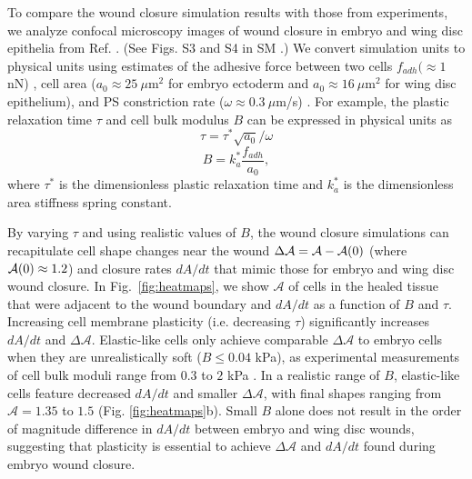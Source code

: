 \documentclass[%
 reprint,
superscriptaddress,
amsmath,amssymb,
prl,
floatfix,
]{revtex4-2}
\begin{document}
To compare the wound closure simulation results with those from experiments, we analyze confocal microscopy images of wound closure in embryo and wing disc epithelia from Ref. \cite{tetley2019tissue}. (See Figs. S3 and S4 in SM \cite{supp}.) We convert simulation units to physical units using estimates of the adhesive force between two cells $f_{adh} (\approx 1~$nN) \cite{krieg2008tensile}, cell area ($a_0 \approx 25~\mu$m$^2$ for embryo ectoderm and $a_0 \approx 16~\mu$m$^2$ for wing disc epithelium), and PS constriction rate ($\omega \approx 0.3~\mu$m/s) \cite{biron2005molecular, stachowiak2014mechanism}. For example, the plastic relaxation time $\tau$ and cell bulk modulus $B$ can be expressed in physical units as 
\begin{equation}
    \label{eq:tau_real_units}
    \tau = \tau^* \sqrt{a_0}/\omega 
\end{equation}
\begin{equation}
    B = k_a^*\frac{f_{adh}}{a_0} \label{eq:B_derivation},
\end{equation}
where $\tau^*$ is the dimensionless plastic relaxation time and $k_a^*$ is the dimensionless area stiffness spring constant. 

By varying $\tau$ and using realistic values of $B$, the wound closure simulations can recapitulate cell shape changes near the wound $\Delta\mathcal{A} = {\cal A} - {\cal A}(0)$ (where ${\cal A}(0) \approx 1.2$) and closure rates $dA/dt$ that mimic those for embryo and wing disc wound closure. In Fig.~\ref{fig:heatmaps}, we show $\mathcal{A}$ of cells in the healed tissue that were adjacent to the wound boundary and $dA/dt$ as a function of $B$ and $\tau$. Increasing cell membrane plasticity (i.e. decreasing $\tau$) significantly increases $dA/dt$ and $\Delta\mathcal{A}$. Elastic-like cells only achieve comparable $\Delta\mathcal{A}$ to embryo cells when they are unrealistically soft ($B \leq 0.04$ kPa), as experimental measurements of cell bulk moduli range from $0.3$ to $2$ kPa \cite{charras2005non,coughlin2006filamin, charras2008life}. In a realistic range of $B$, elastic-like cells feature decreased $dA/dt$ and smaller $\Delta\mathcal{A}$, with final shapes ranging from $\mathcal{A} = 1.35 $ to $1.5$ (Fig. \ref{fig:heatmaps}b). Small $B$ alone does not result in the order of magnitude difference in $dA/dt$ between embryo and wing disc wounds, suggesting that plasticity is essential to achieve $\Delta\mathcal{A}$ and $dA/dt$ found during embryo wound closure.
\end{document}
